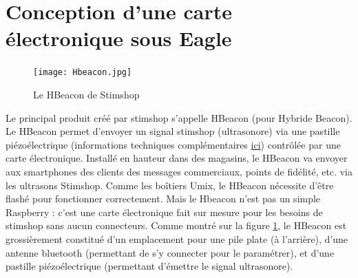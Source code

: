 \documentclass[12pt]{report}
\begin{document}
	\section{Conception d'une carte électronique sous Eagle}

\begin{figure}[h!]
\begin{center}
\texttt{[image: Hbeacon.jpg]}
\end{center}
\caption{Le HBeacon de Stimshop}
\label{Le HBeacon de Stimshop}
\end{figure}

Le principal produit créé par stimshop s'appelle HBeacon (pour Hybride Beacon). Le HBeacon permet d'envoyer un signal stimshop (ultrasonore) via une pastille piézoélectrique (informations techniques complémentaires \href{https://fr.wikipedia.org/wiki/Pi%C3%A9zo%C3%A9lectricit%C3%A9}{ici}) contrôlée par une carte électronique. 
Installé en hauteur dans des magasins, le HBeacon va envoyer aux smartphones des clients des messages commerciaux, points de fidélité, etc. via les ultrasons Stimshop. 
Comme les boîtiers Umix, le HBeacon nécessite d'être flashé pour fonctionner correctement. Mais le Hbeacon n'est pas un simple Raspberry : c'est une carte électronique fait sur mesure pour les besoins de stimshop sans aucun connecteurs. Comme montré sur la figure \ref{Le HBeacon de Stimshop}, le HBeacon est grossièrement constitué d'un emplacement pour une pile plate (à l'arrière), d'une antenne bluetooth (permettant de s'y connecter pour le paramétrer), et d'une pastille piézoélectrique (permettant d'émettre le signal ultrasonore). 
\end{document}
